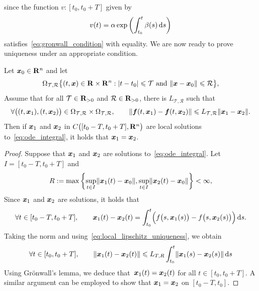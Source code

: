 since the function $v \colon [t_0, t_0 + T]$ given by
\[
    v(t) = \alpha \exp \left( \int_{t_0}^{t} \beta(s) \, \mathrm d s \right)
\]
satisfies~\eqref{eq:gronwall_condition} with equality.
We are now ready to prove uniqueness under an appropriate condition.
\begin{theorem}
    \label{theorem:uniqueness}
    Let $\mathbf{\boldsymbol{x}}_0 \in \mathbf R^n$ and let
    \[
        \Omega_{\mathcal T, \mathcal R}
        \bigl\{(t, \mathbf{\boldsymbol{x}}) \in \mathbf R \times \mathbf R^n: \lvert t - t_0\rvert \leqslant \mathcal T \text{ and } \lVert\mathbf{\boldsymbol{x}} - \mathbf{\boldsymbol{x}}_0\rVert \leqslant \mathcal R \bigr\},
    \]
    Assume that for all $\mathcal T \in \mathbf R_{>0}$ and $\mathcal R \in \mathbf R_{>0}$,
    there is $L_{\mathcal T,  \mathcal R}$ such that
    \begin{equation}
        \label{eq:local_lipschitz_uniqueness}
        \forall \bigl((t, \mathbf{\boldsymbol{x}}_1), (t, \mathbf{\boldsymbol{x}}_2)\bigr) \in \Omega_{\mathcal T, \mathcal R} \times \Omega_{\mathcal T, \mathcal R}, \qquad
        \lVert \mathbf{\boldsymbol{f}}(t, \mathbf{\boldsymbol{x}}_1) - \mathbf{\boldsymbol{f}}(t, \mathbf{\boldsymbol{x}}_2) \rVert \leqslant L_{\mathcal T, \mathcal R} \lVert\mathbf{\boldsymbol{x}}_1 - \mathbf{\boldsymbol{x}}_2\rVert.
    \end{equation}
    Then if $\mathbf{\boldsymbol{x}}_1$ and $\mathbf{\boldsymbol{x}}_2$ in $C\bigl([t_0 - T, t_0 + T], \mathbf R^n\bigr)$ are local solutions to~\eqref{eq:ode_integral},
    it holds that $\mathbf{\boldsymbol{x}}_1 = \mathbf{\boldsymbol{x}}_2$.
\end{theorem}
\begin{proof}
    Suppose that $\mathbf{\boldsymbol{x}}_1$ and $\mathbf{\boldsymbol{x}}_2$ are solutions to~\eqref{eq:ode_integral}.
    Let~$I = [t_0 - T, t_0 + T]$ and
    \[
        R := \max \left\{ \sup_{t \in I} \lVert\mathbf{\boldsymbol{x}}_1(t) - \mathbf{\boldsymbol{x}}_0\rVert,   \sup_{t \in I} \lVert\mathbf{\boldsymbol{x}}_2(t) - \mathbf{\boldsymbol{x}}_0\rVert \right\} < \infty,
    \]
    Since $\mathbf{\boldsymbol{x}}_1$ and $\mathbf{\boldsymbol{x}}_2$ are solutions,
    it holds that
    \[
        \forall t \in [t_0 - T, t_0 + T], \qquad
        \mathbf{\boldsymbol{x}}_1(t) - \mathbf{\boldsymbol{x}}_2(t) = \int_{t_0}^{t} \Bigl( f\bigl(s, \mathbf{\boldsymbol{x}}_1(s)\bigr) - f\bigl(s, \mathbf{\boldsymbol{x}}_2(s)\bigr) \Bigr)  \, \mathrm d s.
    \]
    Taking the norm and using~\eqref{eq:local_lipschitz_uniqueness},
    we obtain
    \[
        \forall t \in [t_0, t_0 + T], \qquad
        \lVert\mathbf{\boldsymbol{x}}_1(t) - \mathbf{\boldsymbol{x}}_2(t)\rVert \leqslant L_{T,R} \int_{t_0}^{t} \lVert\mathbf{\boldsymbol{x}}_1(s) - \mathbf{\boldsymbol{x}}_2(s)\rVert \, \mathrm d s
    \]
    Using Gr\"onwall's lemma,
    we deduce that~$\mathbf{\boldsymbol{x}}_1(t) = \mathbf{\boldsymbol{x}}_2(t)$ for all $t \in [t_0, t_0 + T]$.
    A similar argument can be employed to show that $\mathbf{\boldsymbol{x}}_1 = \mathbf{\boldsymbol{x}}_2$ on $[t_0 - T, t_0]$.
\end{proof}

